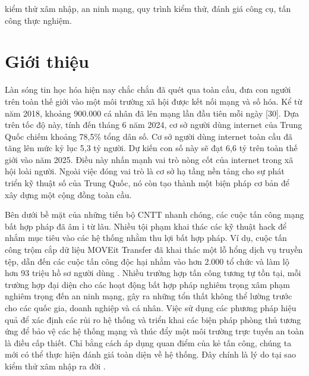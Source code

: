 \documentclass[conference]{IEEEtran}
\begin{document}
\begin{IEEEkeywords}
kiểm thử xâm nhập, an ninh mạng, quy trình kiểm thử, đánh giá công cụ, tấn công thực nghiệm.
\end{IEEEkeywords}

\section{Giới thiệu}
Làn sóng tin học hóa hiện nay chắc chắn đã quét qua toàn cầu, đưa con người trên toàn thế giới vào một môi trường xã hội được kết nối mạng và số hóa. Kể từ năm 2018, khoảng 900.000 cá nhân đã lên mạng lần đầu tiên mỗi ngày [30]. Dựa trên tốc độ này, tính đến tháng 6 năm 2024, cơ sở người dùng internet của Trung Quốc chiếm khoảng 78,5\% tổng dân số. Cơ sở người dùng internet toàn cầu đã tăng lên mức kỷ lục 5,3 tỷ người. Dự kiến con số này sẽ đạt 6,6 tỷ trên toàn thế giới vào năm 2025. Điều này nhấn mạnh vai trò nòng cốt của internet trong xã hội loài người. Ngoài việc đóng vai trò là cơ sở hạ tầng nền tảng cho sự phát triển kỹ thuật số của Trung Quốc, nó còn tạo thành một biện pháp cơ bản để xây dựng một cộng đồng toàn cầu. 

Bên dưới bề mặt của những tiến bộ CNTT nhanh chóng, các cuộc tấn công mạng bất hợp pháp đã âm ỉ từ lâu. Nhiều tội phạm khai thác các kỹ thuật hack để nhắm mục tiêu vào các hệ thống nhằm thu lợi bất hợp pháp. Ví dụ, cuộc tấn công trộm cắp dữ liệu MOVEit Transfer đã khai thác một lỗ hổng dịch vụ truyền tệp, dẫn đến các cuộc tấn công độc hại nhằm vào hơn 2.000 tổ chức và làm lộ hơn 93 triệu hồ sơ người dùng \cite{ref16}. Nhiều trường hợp tấn công tương tự tồn tại, mỗi trường hợp đại diện cho các hoạt động bất hợp pháp nghiêm trọng xâm phạm nghiêm trọng đến an ninh mạng, gây ra những tổn thất không thể lường trước cho các quốc gia, doanh nghiệp và cá nhân. Việc sử dụng các phương pháp hiệu quả để xác định các rủi ro hệ thống và triển khai các biện pháp phòng thủ tương ứng để bảo vệ các hệ thống mạng và thúc đẩy một môi trường trực tuyến an toàn là điều cấp thiết. Chỉ bằng cách áp dụng quan điểm của kẻ tấn công, chúng ta mới có thể thực hiện đánh giá toàn diện về hệ thống. Đây chính là lý do tại sao kiểm thử xâm nhập ra đời \cite{ref12}.
\end{document}

